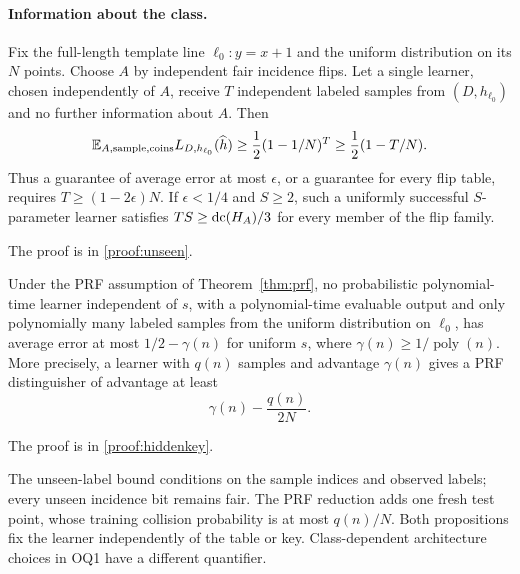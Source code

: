 \paragraph{Information about the class.}
\begin{proposition}\label{prop:unseen}
Fix the full-length template line $\ell_0:y=x+1$ and the uniform distribution on its $N$ points. Choose $A$ by independent fair incidence flips. Let a single learner, chosen independently of $A$, receive $T$ independent labeled samples from $(D,h_{\ell_0})$ and no further information about $A$. Then
\[
 \mathbb E_{A,\mathrm{sample},\mathrm{coins}}L_{D,h_{\ell_0}}(\widehat h)
 \ge\frac12(1-1/N)^T
 \ge\frac12(1-T/N).
\]
Thus a guarantee of average error at most $\epsilon$, or a guarantee for every flip table, requires $T\ge(1-2\epsilon)N$. If $\epsilon<1/4$ and $S\ge2$, such a uniformly successful $S$-parameter learner satisfies $TS\ge\operatorname{dc}(H_A)/3$ for every member of the flip family.
\end{proposition}
\noindent The proof is in \cref{proof:unseen}.
\begin{proposition}\label{prop:hiddenkey}
Under the PRF assumption of Theorem~\ref{thm:prf}, no probabilistic polynomial-time learner independent of $s$, with a polynomial-time evaluable output and only polynomially many labeled samples from the uniform distribution on $\ell_0$, has average error at most $1/2-\gamma(n)$ for uniform $s$, where $\gamma(n)\ge1/\operatorname{poly}(n)$. More precisely, a learner with $q(n)$ samples and advantage $\gamma(n)$ gives a PRF distinguisher of advantage at least
\[
 \gamma(n)-\frac{q(n)}{2N}.
\]
\end{proposition}
\noindent The proof is in \cref{proof:hiddenkey}.

The unseen-label bound conditions on the sample indices and observed labels; every unseen incidence bit remains fair. The PRF reduction adds one fresh test point, whose training collision probability is at most $q(n)/N$. Both propositions fix the learner independently of the table or key. Class-dependent architecture choices in OQ1 have a different quantifier.
